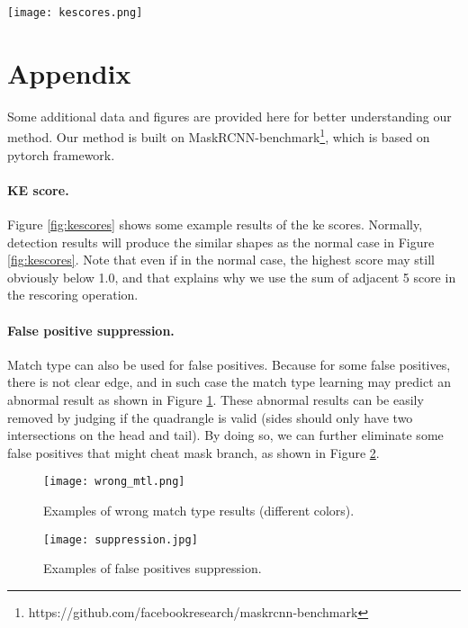 \documentclass{article}
\begin{document}



\begin{figure*}[!t]
  \centering
  \centerline{\texttt{[image: kescores.png]}}
  \caption{Examples of KE score results.}\label{fig:kescores}
\end{figure*}
\newpage
\section*{Appendix}

Some additional data and figures are provided here for better understanding our method. Our method is built on MaskRCNN-benchmark\footnote{https://github.com/facebookresearch/maskrcnn-benchmark}, which is based on pytorch framework.

\paragraph{KE score.} Figure \ref{fig:kescores} shows some example results of the ke scores. Normally, detection results will produce the similar shapes as the normal case in Figure \ref{fig:kescores}. Note that even if in the normal case, the highest score may still obviously below 1.0, and that explains why we use the sum of adjacent 5 score in the rescoring operation.

\paragraph{False positive suppression.} Match type can also be used for false positives. Because for some false positives, there is not clear edge, and in such case the match type learning may predict an abnormal result as shown in Figure \ref{fig:wrong_mtl}. These abnormal results can be easily removed by judging if the quadrangle is valid (sides should only have two intersections on the head and tail). By doing so, we can further eliminate some false positives that might cheat mask branch, as shown in Figure \ref{fig:fpsuppress}.

\begin{figure}[!t]
  \centering
  \centerline{\texttt{[image: wrong\_mtl.png]}}
  \caption{Examples of wrong match type results (different colors).}\label{fig:wrong_mtl}
\end{figure}

\begin{figure}[!t]
  \centering
  \centerline{\texttt{[image: suppression.jpg]}}
  \caption{Examples of false positives suppression.}\label{fig:fpsuppress}
\end{figure}
\end{document}
